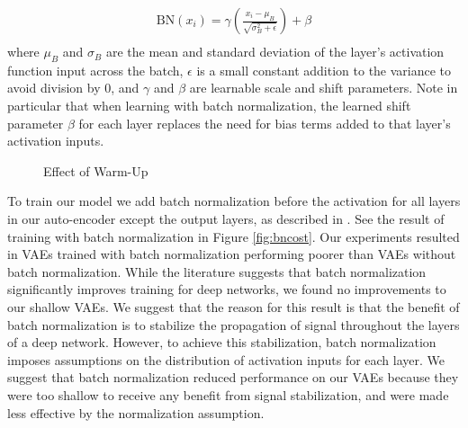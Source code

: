 \documentclass{article} %
\numberwithin{figure}{section}
\begin{document}
\begin{align*}
    \text{BN}(x_i)=\gamma\left(\frac{x_i-\mu_B}{\sqrt{\sigma_B^2+\epsilon}}\right)+\beta\\
\end{align*} 
where $\mu_B$ and $\sigma_B$ are the mean and standard deviation of the layer's activation function input across the batch, $\epsilon$ is a small constant addition to the variance to avoid division by 0, and $\gamma$ and $\beta$ are learnable scale and shift parameters. Note in particular that when learning with batch normalization, the learned shift parameter $\beta$ for each layer replaces the need for bias terms added to that layer's activation inputs.
\begin{wrapfigure}{l}{0.5\textwidth}
    \resizebox{\linewidth}{!}{}
    \caption{Effect of Warm-Up}
    \label{fig:wucost}
\end{wrapfigure}
\par To train our model we add batch normalization before the activation for all layers in our auto-encoder except the output layers, as described in \cite{Sonderby2016}. See the result of training with batch normalization in Figure \ref{fig:bncost}. Our experiments resulted in VAEs trained with batch normalization performing poorer than VAEs without batch normalization. While the literature suggests that batch normalization significantly improves training for deep networks, we found no improvements to our shallow VAEs. We suggest that the reason for this result is that the benefit of batch normalization is to stabilize the propagation of signal throughout the layers of a deep network. However, to achieve this stabilization, batch normalization imposes assumptions on the distribution of activation inputs for each layer. We suggest that batch normalization reduced performance on our VAEs because they were too shallow to receive any benefit from signal stabilization, and were made less effective by the normalization assumption.
\end{document}
